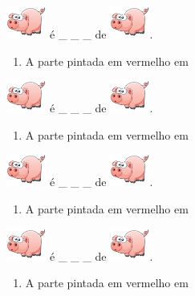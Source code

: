 \documentclass[a4,12pt]{book}
\begin{document}
\includegraphics[height=30pt, keepaspectratio]{pig} é \_ \_ \_   de \includegraphics[height=30pt, keepaspectratio]{pig}.
\begin{enumerate} [\quad a)] %
  \item     A parte pintada em vermelho em 
\end{enumerate} %
\includegraphics[height=30pt, keepaspectratio]{pig} é \_ \_ \_   de \includegraphics[height=30pt, keepaspectratio]{pig}.
\begin{enumerate} [\quad a)] %
  \item     A parte pintada em vermelho em 
\end{enumerate} %
\includegraphics[height=30pt, keepaspectratio]{pig} é \_ \_ \_   de \includegraphics[height=30pt, keepaspectratio]{pig}.
\begin{enumerate} [\quad a)] %
  \item     A parte pintada em vermelho em 
\end{enumerate} %
\includegraphics[height=30pt, keepaspectratio]{pig} é \_ \_ \_   de \includegraphics[height=30pt, keepaspectratio]{pig}.
\begin{enumerate} [\quad a)] %
  \item     A parte pintada em vermelho em 
\end{enumerate} %
\end{document}
